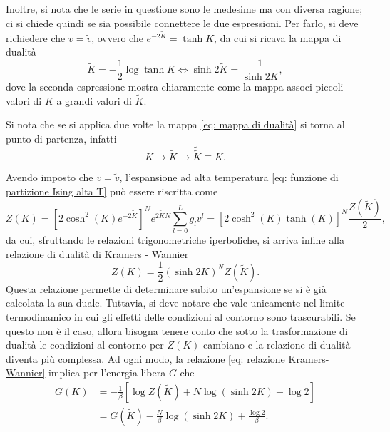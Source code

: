 Inoltre, si nota che le serie in questione sono le medesime ma con diversa ragione; ci si chiede quindi se sia possibile connettere le due espressioni. Per farlo, si deve richiedere che $v = \tilde{v}$, ovvero che $e^{-2\tilde{K}} = \tanh{K}$, da cui si ricava la mappa di dualità
\begin{equation}
\label{eq: mappa di dualità}
    \tilde{K} = -\frac{1}{2}\log\tanh{K}\Longleftrightarrow \sinh{2\tilde{K}} = \frac{1}{\sinh{2K}},
\end{equation}
dove la seconda espressione mostra chiaramente come la mappa associ piccoli valori di $K$ a grandi valori di $\tilde{K}$.
\begin{obs}
    Si nota che se si applica due volte la mappa \eqref{eq: mappa di dualità} si torna al punto di partenza, infatti
    \begin{equation}
        K \longrightarrow \tilde{K} \longrightarrow \tilde{\tilde{K}} \equiv K.
    \end{equation}
\end{obs}
Avendo imposto che $v = \tilde{v}$, l'espansione ad alta temperatura \eqref{eq: funzione di partizione Ising alta T} può essere riscritta come
\begin{equation}
    Z(K) = [2\cosh^2{(K)}e^{-2\tilde{K}}]^Ne^{2\tilde{K}N}\sum_{l=0}^Lg_lv^l = [2\cosh^2{(K)}\tanh{(K)}]^N\frac{Z(\tilde{K})}{2},
\end{equation}
da cui, sfruttando le relazioni trigonometriche iperboliche, si arriva infine alla relazione di dualità di Kramers - Wannier
\begin{equation}
\label{eq: relazione Kramers-Wannier}
    Z(K) = \frac{1}{2}(\sinh{2K})^NZ(\tilde{K}).
\end{equation}
Questa relazione permette di determinare subito un'espansione se si è già calcolata la sua duale. Tuttavia, si deve notare che vale unicamente nel limite termodinamico in cui gli effetti delle condizioni al contorno sono trascurabili. Se questo non è il caso, allora bisogna tenere conto che sotto la trasformazione di dualità le condizioni al contorno per $Z(K)$ cambiano e la relazione di dualità diventa più complessa. Ad ogni modo, la relazione \eqref{eq: relazione Kramers-Wannier} implica per l'energia libera $G$ che
\begin{equation}
\label{eq: relazione Kramers-Wannier energia libera}
    \begin{split}
        G(K) &= -\frac{1}{\beta}[\log{Z(\tilde{K})} + N\log{(\sinh{2K})} - \log{2}] \\
        &= G(\tilde{K}) - \frac{N}{\beta}\log{(\sinh{2K})} + \frac{\log{2}}{\beta}.
    \end{split}
\end{equation}

